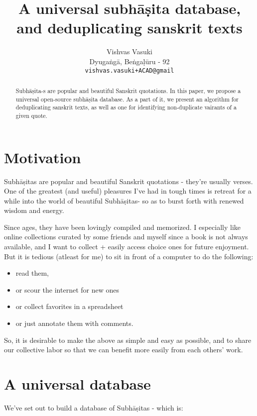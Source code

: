 \documentclass[11pt]{article}
\title{A universal subhāṣita database, and deduplicating sanskrit texts}
\author{Vishvas Vasuki \\
  Dyugaṅgā, Beṅgaḷūru - 92 \\
  {\tt vishvas.vasuki+ACAD@gmail}
\\}
\date{}
\begin{document}
\maketitle
\begin{abstract}
Subhāṣita-s are popular and beautiful Sanskrit quotations. In this paper, we propose a universal open-source subhāṣita database. As a part of it, we present an algorithm for deduplicating sanskrit texts, as well as one for identifying non-duplicate vairants of a given quote.
\end{abstract}

\section{Motivation}
Subhāṣitas are popular and beautiful Sanskrit quotations - they're usually verses. One of the greatest (and useful) pleasures I've had in tough times is retreat for a while into the world of beautiful Subhāṣitas- so as to burst forth with renewed wisdom and energy. 

Since ages, they have been lovingly compiled \cite{subhashita-1952} and memorized. I especially like online collections curated by some friends and myself since a book is not always available, and I want to collect + easily access choice ones for future enjoyment. But it is tedious (atleast for me) to sit in front of a computer to do the following:

\begin{itemize}

\item
  read them,
\item
  or scour the internet for new ones
\item
  or collect favorites in a spreadsheet
\item
  or just annotate them with comments.
\end{itemize}

So, it is desirable to make the above as simple and easy as possible, and to share our collective labor so that we can benefit more easily from each others' work.

\section{A universal database}

We've set out to build a database of Subhāṣitas - which is:
\end{document}

